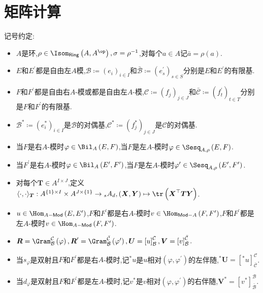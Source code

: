 \section{矩阵计算}

记号约定:
\begin{itemize}
	\item $A$是环,$\rho\in\Isom_{\mathsf{Ring}}\left(A,A^{\op}\right),\sigma=\rho^{-1}$,对每个$a\in A$记$\bar{a}=\rho\left(a\right)$.
	\item $E$和$E^{\prime}$都是自由左$A$模,$\mathcal{B}\coloneq\left(e_{i}\right)_{i\in I}$和$\bar{\mathcal{B}}\coloneq\left(e_{s}^{\prime}\right)_{s\in S}$分别是$E$和$E^{\prime}$的有限基.
	\item $F$和$F^{\prime}$都是自由右$A$-模或都是自由左$A$-模,$\mathcal{C}\coloneq\left(f_{j}\right)_{j\in J}$和$\bar{\mathcal{C}}\coloneq\left(f_{t}^{\prime}\right)_{t\in T}$分别是$F$和$F^{\prime}$的有限基.
	\item $\mathcal{B}^{\ast}\coloneq\left(e_{i}^{\ast}\right)_{i\in I}$是$\mathcal{B}$的对偶基,$\mathcal{C}^{\ast}\coloneq\left(f_{j}^{\ast}\right)_{j\in J}$是$\mathcal{C}$的对偶基.
	\item 当$F$是右$A$-模时$\varphi\in\Bil_{A}\left(E,F\right)$,当$F$是左$A$-模时$\varphi\in\Sesq_{A,\rho}\left(E,F\right)$.
	\item 当$F^{\prime}$是右$A$-模时$\varphi\in\Bil_{A}\left(E^{\prime},F^{\prime}\right)$,当$F$是左$A$-模时$\varphi^{\prime}\in\Sesq_{A,\rho}\left(E^{\prime},F^{\prime}\right)$.
	\item 对每个$\boldsymbol{T}\in A^{I\times J}$,定义$\langle\cdot,\cdot\rangle_{\boldsymbol{T}}:A^{\left\{1\right\}\times I}\times A^{J\times\left\{1\right\}}\to{}_{s}A_{d},\left(\boldsymbol{X},\boldsymbol{Y}\right)\mapsto\tr\left(\boldsymbol{X}^{\top}\boldsymbol{T}\boldsymbol{Y}\right)$.
	\item $u\in\Hom_{A-\mathsf{Mod}}\left(E,E^{\prime}\right)$,$F$和$F^{\prime}$都是右$A$-模时$v\in\Hom_{\mathsf{Mod}-A}\left(F,F^{\prime}\right)$,$F$和$F^{\prime}$都是左$A$-模时$v\in\Hom_{A-\mathsf{Mod}}\left(F,F^{\prime}\right)$.
	\item $\boldsymbol{R}=\Gram_{\mathcal{B}}^{\mathcal{C}}\left(\varphi\right),\boldsymbol{R}^{\prime}=\Gram_{\bar{\mathcal{B}}}^{\bar{\mathcal{C}}}\left(\varphi^{\prime}\right),\boldsymbol{U}=\left[u\right]_{\mathcal{B}}^{\mathcal{C}},\boldsymbol{V}=\left[v\right]_{\bar{\mathcal{B}}}^{\bar{\mathcal{C}}}$.
	\item 当$s_{\varphi}$是双射且$F$和$F^{\prime}$都是右$A$-模时,记${}^{\ast}u$是$u$相对$\left(\varphi,\varphi^{\prime}\right)$的左伴随,${}^{\ast}\boldsymbol{U}=\left[{}^{\ast}u\right]_{\bar{\mathcal{C}}}^{\mathcal{C}}$.
	\item 当$d_{\varphi}$是双射且$F$和$F^{\prime}$都是左$A$-模时,记$v^{\ast}$是$v$相对$\left(\varphi,\varphi^{\prime}\right)$的右伴随,$\boldsymbol{V}^{\ast}=\left[v^{\ast}\right]_{\bar{\mathcal{B}}}^{\mathcal{B}}$.
\end{itemize}

